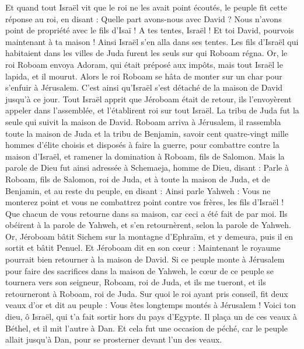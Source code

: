 \begin{multicols}{2}
Et quand tout Israël vit que le roi ne les avait point écoutés, le peuple fit cette réponse au roi, en disant : Quelle part avons-nous avec David ? Nous n'avons point de propriété avec le fils d'Isaï ! A tes tentes, Israël ! Et toi David, pourvois maintenant à ta maison ! Ainsi Israël s'en alla dans ses tentes.
Les fils d'Israël qui habitaient dans les villes de Juda furent les seuls sur qui Roboam régna.
Or, le roi Roboam envoya Adoram, qui était préposé aux impôts, mais tout Israël le lapida, et il mourut. Alors le roi Roboam se hâta de monter sur un char pour s'enfuir à Jérusalem.
C’est ainsi qu’Israël s’est détaché de la maison de David jusqu'à ce jour.
Tout Israël apprit que Jéroboam était de retour, ils l'envoyèrent appeler dans l'assemblée, et l'établirent roi sur tout Israël. La tribu de Juda fut la seule qui suivit la maison de David.
Roboam arriva à Jérusalem, il rassembla toute la maison de Juda et la tribu de Benjamin, savoir cent quatre-vingt mille hommes d’élite choisis et disposés à faire la guerre, pour combattre contre la maison d'Israël, et ramener la domination à Roboam, fils de Salomon.
Mais la parole de Dieu fut ainsi adressée à Schemaeja, homme de Dieu, disant :
Parle à Roboam, fils de Salomon, roi de Juda, et à toute la maison de Juda, et de Benjamin, et au reste du peuple, en disant :
Ainsi parle Yahweh : Vous ne monterez point et vous ne combattrez point contre vos frères, les fils d'Israël ! Que chacun de vous retourne dans sa maison, car ceci a été fait de par moi. Ils obéirent à la parole de Yahweh, et s'en retournèrent, selon la parole de Yahweh.
Or, Jéroboam bâtit Sichem sur la montagne d'Ephraïm, et y demeura, puis il en sortit et bâtit Penuel.
Et Jéroboam dit en son cœur : Maintenant le royaume pourrait bien retourner à la maison de David.
Si ce peuple monte à Jérusalem pour faire des sacrifices dans la maison de Yahweh, le cœur de ce peuple se tournera vers son seigneur, Roboam, roi de Juda, et ils me tueront, et ils retourneront à Roboam, roi de Juda.
Sur quoi le roi ayant pris conseil, fit deux veaux d'or et dit au peuple : Vous êtes longtemps montés à Jérusalem ! Voici ton dieu, ô Israël, qui t'a fait sortir hors du pays d'Egypte.
Il plaça un de ces veaux à Béthel, et il mit l'autre à Dan.
Et cela fut une occasion de péché, car le peuple allait jusqu'à Dan, pour se prosterner devant l'un des veaux.

\end{multicols}
